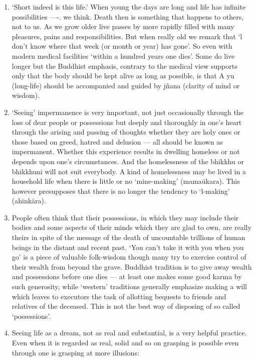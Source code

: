 \begin{enumerate}


\item `Short indeed is this life.' When young the days are long and life has infinite possibilities —-. we think. Death then is something that happens to others, not to us. As we grow older live passes by more rapidly ﬁlled with many pleasures, pains and responsibilities. But when really old we remark that `l don't know where that week (or month or year) has gone'. So even with modern medical facilities `within a hundred years one dies'. Some do live longer but the Buddhist emphasis, contrary to the medical view supports only that the body should be kept alive as long as possible, is that A yu (long-life) should be accompanied and guided by j\~nana (clarity of mind or wisdom).

\item `Seeing' impermanence is very important, not just occasionally through the loss of dear people or possessions but deeply and thoroughly in one's heart through the arising and passing of thoughts whether they are holy ones or those based on greed, hatred and delusion — all should be known as impermanent. Whether this experience results in dwelling homeless or not depends upon one's circumstances. And the homelessness of the bhikkhu or bhikkhuni will not suit everybody. A kind of homelessness may be lived in a household life when there is little or no `mine-making' (mama\=ukara). This however presupposes that there is no longer the tendency to `l-making' (ah\=ink\=ara).

\item People often think that their possessions, in which they may include their bodies and some aspects of their minds which they are glad to own, are really theirs in spite of the message of the death of uncountable trillions of human beings in the distant and recent past. `You can't take it with you when you go' is a piece of valuable folk-wisdom though many try to exercise control of their wealth from beyond the grave. Buddhist tradition is to give away wealth and possessions before one dies — at least one makes some good karma by such generosity, while `western' traditions generally emphasize making a will which leaves to executors the task of allotting bequests to friends and relatives of the deceased. This is not the best way of disposing of so called `possessions'.

\item Seeing life as a dream, not as real and substantial, is a very helpful practice. Even when it is regarded as real, solid and so on grasping is possible even through one is grasping at more illusions:


\end{enumerate}
